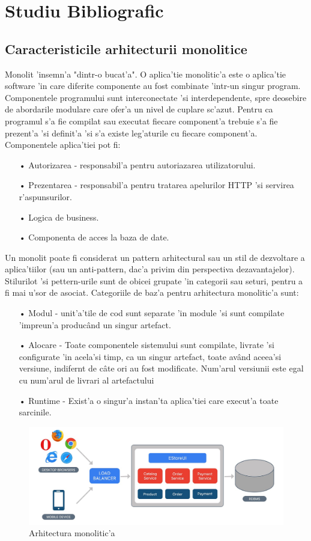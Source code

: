 \documentclass[12pt,a4paper,twoside]{report}
\begin{document}
\chapter{Studiu Bibliografic}
\section{Caracteristicile  arhitecturii monolitice}
Monolit 'insemn'a "dintr-o bucat'a". O aplica'tie monolitic'a este o aplica'tie software 'in care diferite componente au fost combinate 'intr-un singur program. Componentele programului sunt interconectate 'si interdependente, spre deosebire de abordarile modulare care ofer'a un nivel de cuplare sc'azut. Pentru ca programul s'a fie compilat sau executat fiecare component'a trebuie s'a fie prezent'a 'si definit'a 'si s'a existe leg'aturile cu fiecare component'a. Componentele aplica'tiei pot fi:
\begin{itemize}
\item[•]Autorizarea - responsabil'a pentru autoriazarea utilizatorului.\item[•]Prezentarea - responsabil'a pentru tratarea apelurilor HTTP 'si servirea r'aspunsurilor.
 \item[•]Logica de business. 
\item[•]Componenta de acces la baza de date.
\end{itemize}
Un monolit poate fi considerat un pattern arhitectural sau un stil de dezvoltare a aplica'tiilor (sau un anti-pattern, dac'a privim din perspectiva dezavantajelor). Stilurilot 'si pettern-urile sunt de obicei grupate 'in categorii sau seturi, pentru a fi mai u'sor de asociat. Categoriile de baz'a pentru arhitectura monolitic'a sunt:
\begin{itemize}
\item[•] Modul - unit'a'tile de cod sunt separate 'in module 'si sunt compilate 'impreun'a producând un singur artefact.
\item[•] Alocare - Toate componentele sistemului sunt compilate, livrate 'si configurate 'in acela'si timp, ca un singur artefact, toate având aceea'si versiune, indifernt de câte ori au fost modificate. Num'arul versiunii este egal cu num'arul de livrari al artefactului
\item[•] Runtime - Exist'a o singur'a instan'ta aplica'tiei care execut'a toate sarcinile.
\end{itemize}
\begin{figure}[H]
\begin{center}
\advance\leftskip-3cm
\advance\rightskip-3cm
\includegraphics[keepaspectratio=true,scale=0.35]{img/monolith_arhichitecture.jpeg}
\caption{Arhitectura monolitic'a}
\label{monolith_arch}
\end{center}
\end{figure}
\end{document}

